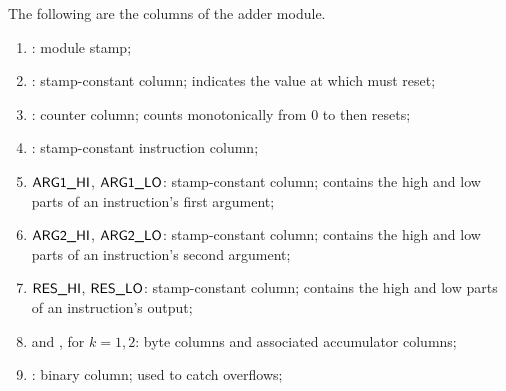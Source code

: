 The following are the columns of the adder module.
\begin{enumerate}
	\item \addStamp:
		module stamp;
	\item \maxCt:
		stamp-constant column;
		indicates the value at which \ct{} must reset;
	\item \ct:
		counter column;
		counts monotonically from $0$ to \maxCt{} then resets;
	\item \INST:
		stamp-constant instruction column;
	\item $\textsf{ARG}\textsf{1}\textsf{\_HI}$, $\textsf{ARG}\textsf{1}\textsf{\_LO}$:
		stamp-constant column;
		contains the high and low parts of an instruction's first argument;
	\item $\textsf{ARG}\textsf{2}\textsf{\_HI}$, $\textsf{ARG}\textsf{2}\textsf{\_LO}$:
		stamp-constant column;
		contains the high and low parts of an instruction's second argument;
	\item $\textsf{RES}\textsf{\_HI}$, $\textsf{RES}\textsf{\_LO}$:
		stamp-constant column;
		contains the high and low parts of an instruction's output;
	\item {} and , for $k = 1, 2$:
		byte columns and associated accumulator columns;
	\item \overflow:
		binary column;
		used to catch overflows;
\end{enumerate}

